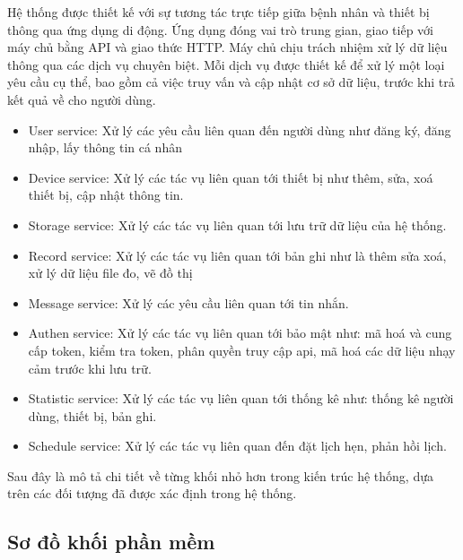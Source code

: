 Hệ thống được thiết kế với sự tương tác trực tiếp giữa bệnh nhân và thiết bị thông qua ứng dụng di động. 
Ứng dụng đóng vai trò trung gian, giao tiếp với máy chủ bằng API và giao thức HTTP. 
Máy chủ chịu trách nhiệm xử lý dữ liệu thông qua các dịch vụ chuyên biệt. 
Mỗi dịch vụ được thiết kế để xử lý một loại yêu cầu cụ thể, bao gồm cả việc truy vấn và cập nhật cơ sở dữ liệu, 
trước khi trả kết quả về cho người dùng.\begin{adjustwidth}{1.5em}{}
\begin{itemize}
  \item User service: Xử lý các yêu cầu liên quan đến người dùng như đăng ký, đăng nhập, lấy thông tin cá nhân
  \item Device service: Xử lý các tác vụ liên quan tới thiết bị như thêm, sửa, xoá thiết bị, cập nhật thông tin.
  \item Storage service: Xử lý các tác vụ liên quan tới lưu trữ dữ liệu của hệ thống.
  \item Record service: Xử lý các tác vụ liên quan tới bản ghi như là thêm sửa xoá, xử lý dữ liệu file đo, vẽ đồ thị
  \item Message service: Xử lý các yêu cầu liên quan tới tin nhắn.
  \item Authen service: Xử lý các tác vụ liên quan tới bảo mật như: mã hoá và cung cấp token, kiểm tra token, phân quyền truy cập api, mã hoá các dữ liệu nhạy cảm trước khi lưu trữ.
  \item Statistic service: Xử lý các tác vụ liên quan tới thống kê như: thống kê người dùng, thiết bị, bản ghi.
  \item Schedule service: Xử lý các tác vụ liên quan đến đặt lịch hẹn, phản hồi lịch.
\end{itemize}
\end{adjustwidth}

Sau đây là mô tả chi tiết về từng khối nhỏ hơn trong kiến trúc hệ thống, dựa trên các đối tượng đã được xác định trong hệ thống.
\newpage
\subsection{Sơ đồ khối phần mềm}
